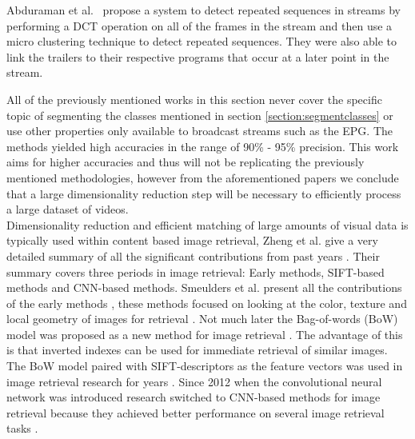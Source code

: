 \documentclass{article}
\begin{document}
Abduraman et al.\ \cite{abduraman2011unsupervised} propose a system to detect repeated sequences in streams by performing a DCT operation on all of the frames in the stream and then use a micro clustering technique to detect repeated sequences. They were also able to link the trailers to their respective programs that occur at a later point in the stream.

All of the previously mentioned works in this section never cover the specific topic of segmenting the classes mentioned in section \ref{section:segmentclasses} or use other properties only available to broadcast streams such as the EPG. The methods yielded high accuracies in the range of 90\% - 95\% precision. This work aims for higher accuracies and thus will not be replicating the previously mentioned methodologies, however from the aforementioned papers we conclude that a large dimensionality reduction step will be necessary to efficiently process a large dataset of videos.
\\

Dimensionality reduction and efficient matching of large amounts of visual data is typically used within content based image retrieval, Zheng et al. give a very detailed summary of all the significant contributions from past years \cite{zheng2018sift}. Their summary covers three periods in image retrieval: Early methods, SIFT-based methods and CNN-based methods. Smeulders et al. present all the contributions of the early methods \cite{smeulders2000content}, these methods focused on looking at the color, texture and local geometry of images for retrieval \cite{yu2002color,manjunath1996texture}. Not much later the Bag-of-words (BoW) model was proposed as a new method for image retrieval \cite{sivic2003video}. The advantage of this is that inverted indexes can be used for immediate retrieval of similar images. The BoW model paired with SIFT-descriptors \cite{lowe2004distinctive} as the feature vectors was used in image retrieval research for years \cite{nister2006scalable,philbin2007object,jegou2008hamming,jegou2010aggregating,jegou2012aggregating}. Since 2012 when the convolutional neural network was introduced \cite{krizhevsky2012imagenet} research switched to CNN-based methods for image retrieval because they achieved better performance on several image retrieval tasks	 \cite{babenko2014neural,yue2015exploiting, tolias2015particular}.


\iffalse
\cite{li2000automatic} %

\cite{lienhart1997detection} %
\cite{covell2006advertisement} %
\end{document}
